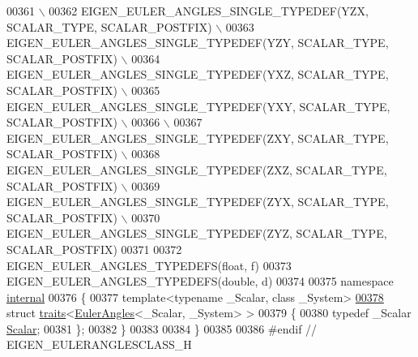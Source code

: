 \begin{DoxyCode}
00361 \textcolor{preprocessor}{ \(\backslash\)}
00362 \textcolor{preprocessor}{  EIGEN\_EULER\_ANGLES\_SINGLE\_TYPEDEF(YZX, SCALAR\_TYPE, SCALAR\_POSTFIX) \(\backslash\)}
00363 \textcolor{preprocessor}{  EIGEN\_EULER\_ANGLES\_SINGLE\_TYPEDEF(YZY, SCALAR\_TYPE, SCALAR\_POSTFIX) \(\backslash\)}
00364 \textcolor{preprocessor}{  EIGEN\_EULER\_ANGLES\_SINGLE\_TYPEDEF(YXZ, SCALAR\_TYPE, SCALAR\_POSTFIX) \(\backslash\)}
00365 \textcolor{preprocessor}{  EIGEN\_EULER\_ANGLES\_SINGLE\_TYPEDEF(YXY, SCALAR\_TYPE, SCALAR\_POSTFIX) \(\backslash\)}
00366 \textcolor{preprocessor}{ \(\backslash\)}
00367 \textcolor{preprocessor}{  EIGEN\_EULER\_ANGLES\_SINGLE\_TYPEDEF(ZXY, SCALAR\_TYPE, SCALAR\_POSTFIX) \(\backslash\)}
00368 \textcolor{preprocessor}{  EIGEN\_EULER\_ANGLES\_SINGLE\_TYPEDEF(ZXZ, SCALAR\_TYPE, SCALAR\_POSTFIX) \(\backslash\)}
00369 \textcolor{preprocessor}{  EIGEN\_EULER\_ANGLES\_SINGLE\_TYPEDEF(ZYX, SCALAR\_TYPE, SCALAR\_POSTFIX) \(\backslash\)}
00370 \textcolor{preprocessor}{  EIGEN\_EULER\_ANGLES\_SINGLE\_TYPEDEF(ZYZ, SCALAR\_TYPE, SCALAR\_POSTFIX)}
00371 
00372 EIGEN\_EULER\_ANGLES\_TYPEDEFS(\textcolor{keywordtype}{float}, f)
00373 EIGEN\_EULER\_ANGLES\_TYPEDEFS(\textcolor{keywordtype}{double}, d)
00374 
00375   \textcolor{keyword}{namespace }\hyperlink{namespaceinternal}{internal}
00376   \{
00377     \textcolor{keyword}{template}<\textcolor{keyword}{typename} \_Scalar, \textcolor{keyword}{class} \_System>
\hyperlink{struct_eigen_1_1internal_1_1traits_3_01_euler_angles_3_01___scalar_00_01___system_01_4_01_4}{00378}     \textcolor{keyword}{struct }\hyperlink{struct_eigen_1_1internal_1_1traits}{traits}<\hyperlink{class_eigen_1_1_euler_angles}{EulerAngles}<\_Scalar, \_System> >
00379     \{
00380       \textcolor{keyword}{typedef} \_Scalar \hyperlink{class_eigen_1_1_euler_angles_a2ab1d433ac9683268446f8905ac31aac}{Scalar};
00381     \};
00382   \}
00383   
00384 \}
00385 
00386 \textcolor{preprocessor}{#endif // EIGEN\_EULERANGLESCLASS\_H}
\end{DoxyCode}
